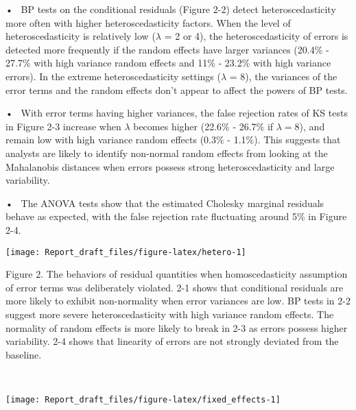 \documentclass[12pt]{article}
\begin{document}
• ~BP tests on the conditional residuals (Figure 2-2) detect
heteroscedasticity more often with higher heteroscedasticity factors.
When the level of heteroscedasticity is relatively low (\(\lambda\) = 2
or 4), the heteroscedasticity of errors is detected more frequently if
the random effects have larger variances (20.4\% - 27.7\% with high
variance random effects and 11\% - 23.2\% with high variance errors). In
the extreme heteroscedasticity settings (\(\lambda\) = 8), the variances
of the error terms and the random effects don't appear to affect the
powers of BP tests.

• ~With error terms having higher variances, the false rejection rates
of KS tests in Figure 2-3 increase when \(\lambda\) becomes higher
(22.6\% - 26.7\% if \(\lambda=8\)), and remain low with high variance
random effects (0.3\% - 1.1\%). This suggests that analysts are likely
to identify non-normal random effects from looking at the Mahalanobis
distances when errors possess strong heteroscedasticity and large
variability.

• ~The ANOVA tests show that the estimated Cholesky marginal residuals
behave as expected, with the false rejection rate fluctuating around 5\%
in Figure 2-4.

\begin{center}\texttt{[image: Report\_draft\_files/figure-latex/hetero-1]} \end{center}

\vspace{-7pt}

\begin{spacing}{0.5}
\begingroup
{}\fontsize{6}{16}\selectfont
Figure 2. The behaviors of residual quantities when homoscedasticity assumption of error terms was deliberately violated.
2-1 shows that conditional residuals are more likely to exhibit non-normality when error variances are low. BP tests in 2-2 suggest more severe heteroscedasticity with high variance random effects. The normality of random effects is more likely to break in 2-3 as errors possess higher variability. 2-4 shows that linearity of errors are not strongly deviated from the baseline. 
\endgroup
\end{spacing}

~

\begin{center}\texttt{[image: Report\_draft\_files/figure-latex/fixed\_effects-1]} \end{center}
\end{document}
